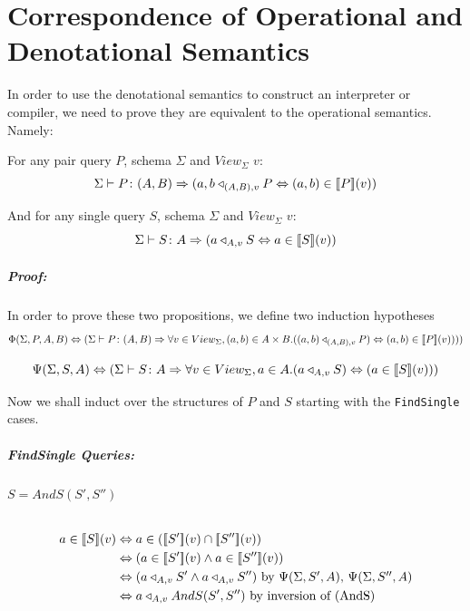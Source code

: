 \documentclass[12pt,a4paper,twoside,openright]{report}
\newcommand\codeName[1]{\texttt{#1}}
\newcommand{\db}[1]{{\bf [\![}#1{\bf ]\!]}}
\newcommand{\deno}[1]{\db{#1}(v)}
\newcommand{\typeRule}[2]{\Sigma\vdash #1 \colon #2}
\newcommand{\denoRule}[2]{#1 \in \deno{#2}}
\newcommand{\opRule}[3]{#1 \triangleleft_{#2, v} #3}
\newcommand{\phiRule}[3]{\Phi(\Sigma, #1, #2, #3)}
\newcommand{\psiRule}[2]{\Psi(\Sigma, #1, #2)}
\let\oldparagraph\paragraph
\renewcommand{\paragraph}[1]{\oldparagraph{#1}\mbox{}}
\let\oldsubparagraph\subparagraph
\renewcommand{\subparagraph}[1]{\oldsubparagraph{#1}\mbox{}}
\begin{document}
\prevdepth\tpd

\chapter{Correspondence of Operational and Denotational Semantics}
\label{DenoOper}
In order to use the denotational semantics to construct an interpreter or compiler, we need to prove they are equivalent to the operational semantics. Namely:

For any pair query $P$, schema $\Sigma$ and $View_{\Sigma}$ $v$:
\[
\typeRule{P}{(A, B)}\Rightarrow \opRule{(a, b}{(A, B)}{P} \Leftrightarrow \denoRule{(a, b)}{P})
\]

And for any single query $S$, schema $\Sigma$ and $View_{\Sigma}$ $v$: 
\[
\typeRule{S}{A}\Rightarrow \opRule{(a}{A}{S} \Leftrightarrow \denoRule{a}{S})
\]

\paragraph{Proof: }In order to prove these two propositions, we define two induction hypotheses
\[
\phiRule{P}{A}{B} \Leftrightarrow (\typeRule{P}{(A, B)} \Rightarrow \forall v \in View_{\Sigma}, (a, b) \in A \times B. (\opRule{(a, b)}{(A, B)}{P}) \Leftrightarrow \denoRule{(a, b)}{P})))
\]

\[
\psiRule{S}{A} \Leftrightarrow (\typeRule{S}{A} \Rightarrow \forall v \in View_{\Sigma}, a \in A. (\opRule{a}{A}{S}) \Leftrightarrow (\denoRule{a}{S}))
\]

Now we shall induct over the structures of $P$ and $S$ starting with the \codeName{FindSingle} cases.

\paragraph{FindSingle Queries:}

\subparagraph{$S = AndS(S', S'')$}
\begin{equation} \label{case AndS}
\begin{split}
\denoRule{a}{S} & \Leftrightarrow a \in (\deno{S'} \cap \deno{S''}) \\
				& \Leftrightarrow (\denoRule{a}{S'} \wedge \denoRule{a}{S''}) \\
				& \Leftrightarrow (\opRule{a}{A}{S'} \wedge \opRule{a}{A}{S''}) \mbox{ by $\psiRule{S'}{A}$, $\psiRule{S''}{A}$}\\
				& \Leftrightarrow \opRule{a}{A}{AndS(S', S'')} \mbox{ by inversion of (AndS)}
\end{split}
\end{equation}
\end{document}
